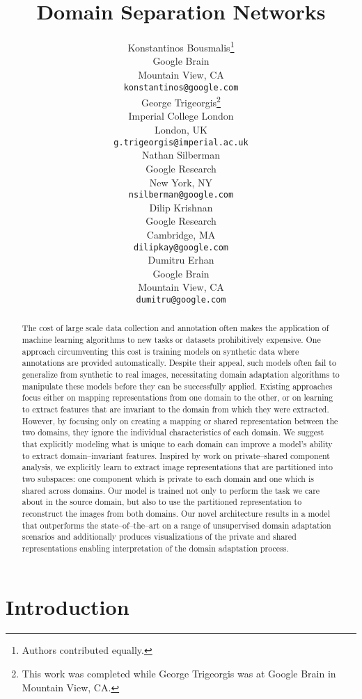 \documentclass{article}
\title{Domain Separation Networks}
\author{
  Konstantinos Bousmalis\thanks{Authors contributed equally.} \\
  Google Brain\\
  Mountain View, CA \\
  \texttt{konstantinos@google.com} \\
\And
  George Trigeorgis\footnotemark[1] \hspace{1mm}\thanks{This work was completed while George Trigeorgis was at Google Brain in Mountain View, CA.} \\
  Imperial College London \\
  London, UK\\
  \texttt{g.trigeorgis@imperial.ac.uk} \\
  \And
  Nathan Silberman \\
  Google Research \\
  New York, NY \\
  \texttt{nsilberman@google.com} \\
  \And
  Dilip Krishnan \\
  Google Research \\
  Cambridge, MA \\
   \texttt{dilipkay@google.com} \\
   \And
  Dumitru Erhan \\
  Google Brain \\
  Mountain View, CA \\
   \texttt{dumitru@google.com} \\
}
\begin{document}
\maketitle
\vspace{-4mm}
\begin{abstract}
\vspace{-4mm}
The cost of large scale data collection and annotation often makes the
application of machine learning algorithms to new tasks or datasets
prohibitively expensive. One approach circumventing this cost is training
models on synthetic data where annotations are provided automatically.
Despite their appeal, such models often fail to
generalize from synthetic to real images, necessitating
domain adaptation algorithms to manipulate these models before they can
be successfully applied. Existing approaches focus either on mapping
representations from one domain to the other, or on learning to extract features
that are invariant to the domain from which they were extracted.
However, by focusing only on creating a mapping or shared representation
between the two domains, they ignore the individual characteristics of
each domain. We suggest that explicitly modeling what is unique to each domain
can improve a model's ability to extract domain--invariant features.
Inspired by work on private--shared component analysis, we explicitly
learn to extract image representations that are partitioned into two
subspaces: one component which is private to each domain and one which
is shared across domains. Our model is trained not only to perform the
task we care about in the source domain, but
also to use the partitioned representation to reconstruct the images
from both domains. Our novel architecture results in a model that outperforms
the state--of--the--art on a range of unsupervised domain
adaptation scenarios and additionally produces visualizations of the private
and shared representations enabling interpretation of the domain adaptation
process.
\vspace{-4mm}
\end{abstract}
\section{Introduction}
\vspace{-3mm}
\end{document}
